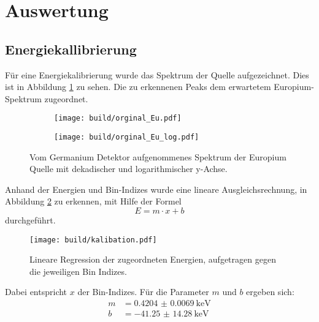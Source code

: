 \newpage
\section{Auswertung}
\label{sec:Auswertung}

\subsection{Energiekallibrierung}
\label{sec:Energiekallibrierung}
Für eine Energiekalibrierung wurde das Spektrum der  Quelle
aufgezeichnet. Dies ist in Abbildung \ref{plt:Eu-Spektrum} zu sehen. Die zu
erkennenen Peaks dem erwartetem Europium-Spektrum zugeordnet.


\begin{figure}[htb]
  \begin{subfigure}{0.5\textwidth}
    \centering
    \texttt{[image: build/orginal\_Eu.pdf]}
  \end{subfigure}
  \begin{subfigure}{0.5\textwidth}
    \centering
    \texttt{[image: build/orginal\_Eu\_log.pdf]}
  \end{subfigure}
  \caption{Vom Germanium Detektor aufgenommenes Spektrum der Europium Quelle mit
  dekadischer und logarithmischer y-Achse.}
  \label{plt:Eu-Spektrum}
\end{figure}

Anhand der Energien und Bin-Indizes wurde eine lineare Ausgleichsrechnung, in
Abbildung \ref{plt:eichung} zu erkennen, mit Hilfe der Formel
\begin{equation}
  E = m \cdot x + b
\end{equation}
durchgeführt.

\begin{figure}[htb]
  \centering
  \texttt{[image: build/kalibation.pdf]}
  \caption{Lineare Regression der zugeordneten Energien, aufgetragen gegen die jeweiligen Bin Indizes.}
  \label{plt:eichung}
\end{figure}

Dabei entspricht $x$ der Bin-Indizes. Für die Parameter $m$ und
$b$ ergeben sich:
\begin{align}
  m &= \SI{0.4204(69)}{\kilo\electronvolt} \\
  b &= \SI{-41.25(1428)}{\kilo\electronvolt}
\end{align}



